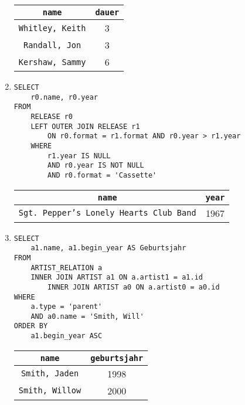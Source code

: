 \documentclass{article}
\begin{document}
\begin{enumerate}
            \begin{tabular}{|c|c|}
                \texttt{name} & \texttt{dauer} \\
                \toprule
                \texttt{Whitley, Keith} & 3 \\
                \texttt{Randall, Jon} & 3 \\
                \texttt{Kershaw, Sammy} & 6 \\
            \end{tabular}
        \item
            \begin{verbatim}
SELECT
    r0.name, r0.year
FROM
    RELEASE r0
    LEFT OUTER JOIN RELEASE r1
        ON r0.format = r1.format AND r0.year > r1.year
    WHERE
        r1.year IS NULL
        AND r0.year IS NOT NULL
        AND r0.format = 'Cassette'
            \end{verbatim}
            \begin{tabular}{|c|c|}
                \texttt{name} & \texttt{year} \\
                \toprule
                \texttt{Sgt. Pepper’s Lonely Hearts Club Band} & 1967 \\
            \end{tabular}
        \item
            \begin{verbatim}
SELECT
    a1.name, a1.begin_year AS Geburtsjahr
FROM
    ARTIST_RELATION a
    INNER JOIN ARTIST a1 ON a.artist1 = a1.id
        INNER JOIN ARTIST a0 ON a.artist0 = a0.id
WHERE
    a.type = 'parent'
    AND a0.name = 'Smith, Will'
ORDER BY
    a1.begin_year ASC
            \end{verbatim}
            \begin{tabular}{|c|c|}
                \texttt{name} & \texttt{geburtsjahr} \\
                \toprule
                \texttt{Smith, Jaden} & 1998 \\
                \texttt{Smith, Willow} & 2000 \\
            \end{tabular}
    \end{enumerate}
\end{document}
